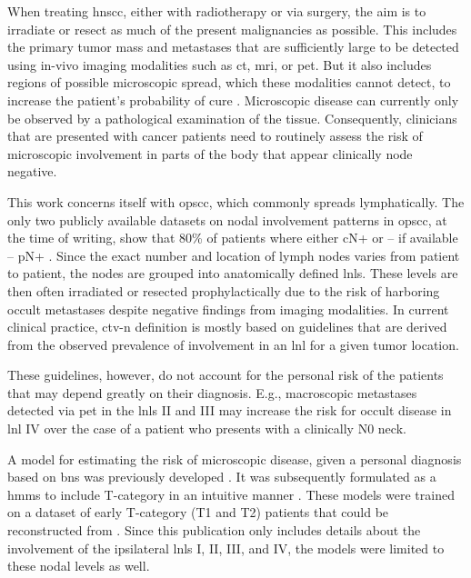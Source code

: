 \documentclass[twocolumn]{aastex631}
\begin{document}
When treating \gls{hnscc}, either with radiotherapy or via surgery, the aim is to irradiate or resect as much of the present malignancies as possible. This includes the primary tumor mass and metastases that are sufficiently large to be detected using in-vivo imaging modalities such as \gls{ct}, \gls{mri}, or \gls{pet}. But it also includes regions of possible microscopic spread, which these modalities cannot detect, to increase the patient's probability of cure \cite{poortmans_internal_2020,murthy_prostate-only_2021}. Microscopic disease can currently only be observed by a pathological examination of the tissue. Consequently, clinicians that are presented with cancer patients need to routinely assess the risk of microscopic involvement in parts of the body that appear clinically node negative.

This work concerns itself with \gls{opscc}, which commonly spreads lymphatically. The only two publicly available datasets on nodal involvement patterns in \gls{opscc}, at the time of writing, show that 80\% of patients where either cN+ or -- if available -- pN+ \cite{ludwig_dataset_2022}. Since the exact number and location of lymph nodes varies from patient to patient, the nodes are grouped into anatomically defined \glspl{lnl}. These levels are then often irradiated or resected prophylactically due to the risk of harboring occult metastases despite negative findings from imaging modalities. In current clinical practice, \gls{ctv-n} definition is mostly based on guidelines \cite{gregoire_ct-based_2003,gregoire_delineation_2014,gregoire_delineation_2018,eisbruch_intensity-modulated_2002,biau_selection_2019,chao_determination_2002,vorwerk_guidelines_2011,ferlito_elective_2009} that are derived from the observed prevalence of involvement in an \gls{lnl} for a given tumor location.

These guidelines, however, do not account for the personal risk of the patients that may depend greatly on their diagnosis. E.g., macroscopic metastases detected via \gls{pet} in the \glspl{lnl} II and III may increase the risk for occult disease in \gls{lnl} IV over the case of a patient who presents with a clinically N0 neck.

A model for estimating the risk of microscopic disease, given a personal diagnosis based on \glspl{bn} was previously developed \cite{pouymayou_bayesian_2019}. It was subsequently formulated as a \glspl{hmm} to include T-category in an intuitive manner \cite{ludwig_hidden_2021}. These models were trained on a dataset of early T-category (T1 and T2) patients that could be reconstructed from \cite{sanguineti_defining_2009}. Since this publication only includes details about the involvement of the ipsilateral \glspl{lnl} I, II, III, and IV, the models were limited to these nodal levels as well.
\end{document}

